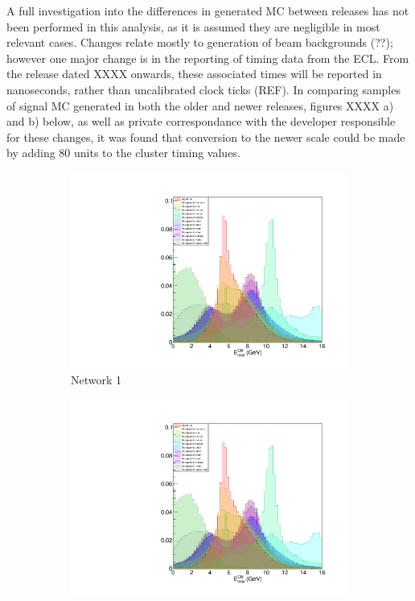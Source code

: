 \documentclass[12pt]{thesis}  %
\begin{document}
A full investigation into the differences in generated MC between releases has not been performed in this analysis, as it is assumed they are negligible in most relevant cases. Changes relate mostly to generation of beam backgrounds (??); however one major change is in the reporting of timing data from the ECL. From the release dated XXXX onwards, these associated times will be reported in nanoseconds, rather than uncalibrated clock ticks (REF). In comparing samples of signal MC generated in both the older and newer releases, figures XXXX a) and b) below, as well as private correspondance with the developer responsible for these changes, it was found that conversion to the newer scale could be made by adding 80 units to the cluster timing values.

   \begin{figure}[h]
        \centering
        \begin{subfigure}[b]{0.475\textwidth}
            \centering
            \includegraphics[width=\textwidth]{images/test.pdf}
            \caption[Network2]%
            {{\small Network 1}}    
            \label{fig:mean and std of net14}
        \end{subfigure}
        \hfill
        \begin{subfigure}[b]{0.475\textwidth}  
            \centering 
            \includegraphics[width=\textwidth]{images/test.pdf}

\end{subfigure}
\end{figure}
\end{document}
